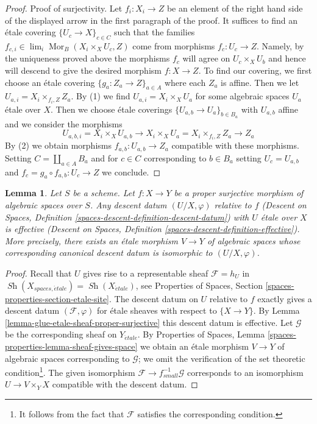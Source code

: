 \documentclass[10pt,a4paper]{amsart}
\theoremstyle{plain}
\newtheorem{lemma}[subsection]{Lemma}
\theoremstyle{definition}
\theoremstyle{remark}
\numberwithin{equation}{subsection}
\def\lim{\mathop{\mathrm{lim}}\nolimits}
\def\Mor{\mathop{\mathrm{Mor}}\nolimits}
\def\Sh{\mathop{\mathit{Sh}}\nolimits}
\def\etale{{\acute{e}tale}}
\begin{document}
\begin{proof}
\medskip\noindent
Proof of surjectivity. Let $f_i : X_i \to Z$ be an element of the
right hand side of the displayed arrow in the first paragraph of the proof.
It suffices to find an \'etale covering $\{U_c \to X\}_{c \in C}$
such that the families $f_{c, i} \in \lim_i \Mor_B(X_i \times_X U_c, Z)$
come from morphisms $f_c : U_c \to Z$. Namely, by the uniqueness
proved above the morphisms $f_c$ will agree on $U_c \times_X U_b$
and hence will descend to give the desired morphism $f : X \to Z$.
To find our covering, we first choose an \'etale covering
$\{g_a : Z_a \to Z\}_{a \in A}$ where each $Z_a$ is affine. Then we let
$U_{a, i} = X_i \times_{f_i, Z} Z_a$. By (1) we find
$U_{a, i} = X_i \times_X U_a$ for some algebraic spaces $U_a$ \'etale
over $X$. Then we choose \'etale coverings
$\{U_{a, b} \to U_a\}_{b \in B_a}$
with $U_{a, b}$ affine and we consider the morphisms
$$
U_{a, b, i} = X_i \times_X U_{a, b} \to
X_i \times_X U_a = X_i \times_{f_i, Z} Z_a \to Z_a
$$
By (2) we obtain morphisms $f_{a, b} : U_{a, b} \to Z_a$ compatible with these
morphisms. Setting $C = \coprod_{a \in A} B_a$ and for $c \in C$
corresponding to $b \in B_a$ setting $U_c = U_{a, b}$ and
$f_c = g_a \circ f_{a, b} : U_c \to Z$ we conclude.
\end{proof}

\begin{lemma}
\label{lemma-descend-etale-proper-surjective}
Let $S$ be a scheme. Let $f : X \to Y$ be a proper surjective morphism
of algebraic spaces over $S$. Any descent datum $(U/X, \varphi)$ relative to $f$
(Descent on Spaces, Definition \ref{spaces-descent-definition-descent-datum})
with $U$ \'etale over $X$ is effective
(Descent on Spaces, Definition \ref{spaces-descent-definition-effective}).
More precisely, there exists an \'etale morphism $V \to Y$ of algebraic spaces
whose corresponding canonical descent datum is isomorphic to $(U/X, \varphi)$.
\end{lemma}

\begin{proof}
Recall that $U$ gives rise to a representable sheaf
$\mathcal{F} = h_U$ in $\Sh(X_{spaces, \etale}) = \Sh(X_\etale)$, see
Properties of Spaces, Section \ref{spaces-properties-section-etale-site}.
The descent datum on $U$ relative to $f$
exactly gives a descent datum $(\mathcal{F}, \varphi)$
for \'etale sheaves with respect to $\{X \to Y\}$.
By Lemma \ref{lemma-glue-etale-sheaf-proper-surjective}
this descent datum is effective.
Let $\mathcal{G}$ be the corresponding sheaf on $Y_\etale$.
By Properties of Spaces, Lemma \ref{spaces-properties-lemma-sheaf-gives-space}
we obtain an \'etale morphism $V \to Y$ of algebraic spaces
corresponding to $\mathcal{G}$; we omit the verification of
the set theoretic condition\footnote{It follows from the
fact that $\mathcal{F}$ satisfies the corresponding condition.}.
The given isomorphism $\mathcal{F} \to f_{small}^{-1}\mathcal{G}$
corresponds to an isomorphism $U \to V \times_Y X$ compatible
with the descent datum.
\end{proof}
\end{document}
